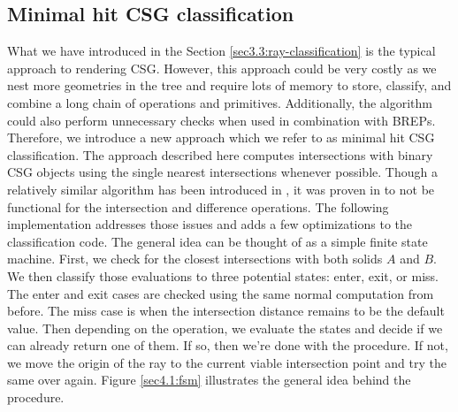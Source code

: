 \documentclass[a4paper,11pt,oneside]{article}
\begin{document}
\subsection{Minimal hit CSG classification}
\label{section:classification-optimization}


What we have introduced in the Section \ref{sec3.3:ray-classification} is the typical approach to rendering CSG. However, this approach could be very costly as we nest more geometries in the tree and require lots of memory to store, classify, and combine a long chain of operations and primitives. Additionally, the algorithm could also perform unnecessary checks when used in combination with BREPs. Therefore, we introduce a new approach which we refer to as minimal hit CSG classification. The approach described here computes intersections with binary CSG objects using the single nearest intersections whenever possible. Though a relatively similar algorithm has been introduced in \cite{kensler_ray_2006}, it was proven in \cite{csg-xrt-renderer} to not be functional for the intersection and difference operations. The following implementation addresses those issues and adds a few optimizations to the classification code. The general idea can be thought of as a simple finite state machine. First, we check for the closest intersections with both solids $A$ and $B$. We then classify those evaluations to three potential states: enter, exit, or miss. The enter and exit cases are checked using the same normal computation from before. The miss case is when the intersection distance remains to be the default value. Then depending on the operation, we evaluate the states and decide if we can already return one of them. If so, then we're done with the procedure. If not, we move the origin of the ray to the current viable intersection point and try the same over again. Figure \ref{sec4.1:fsm} illustrates the general idea behind the procedure.   
\end{document}
